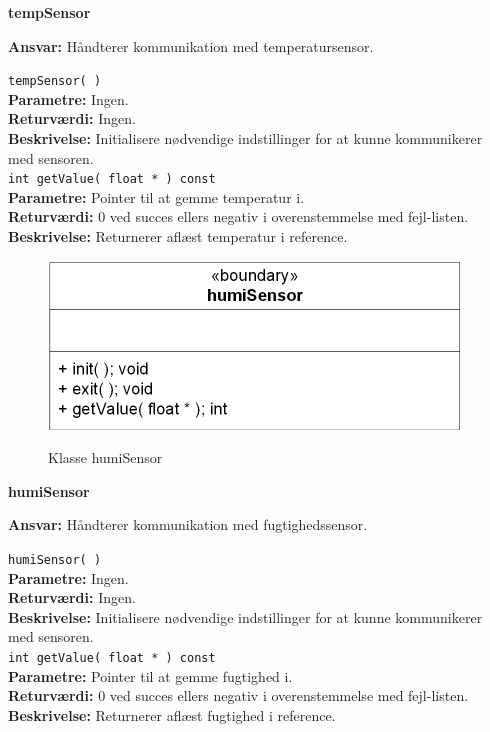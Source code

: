 {\centering
\textbf{tempSensor}\par
}
\textbf{Ansvar:} Håndterer kommunikation med temperatursensor. \

\verb+tempSensor( )+ \\
\textbf{Parametre:} Ingen. \\
\textbf{Returværdi:} Ingen. \\
\textbf{Beskrivelse:} Initialisere nødvendige indstillinger for at kunne kommunikerer med sensoren. \\

\verb+int getValue( float * ) const+ \\
\textbf{Parametre:} Pointer til at gemme temperatur i. \\
\textbf{Returværdi:} 0 ved succes ellers negativ i overenstemmelse med fejl-listen. \\
\textbf{Beskrivelse:} Returnerer aflæst temperatur i reference. \\


\begin{figure}[htbp] \centering
{\includegraphics[scale=1.3]{filer/design/Klassediagrammer/sw_psoc_humiSensor}}
\caption{Klasse humiSensor}
\label{fig:sw_psoc_class_humiSensor}
\end{figure} 

{\centering
\textbf{humiSensor}\par
}
\textbf{Ansvar:} Håndterer kommunikation med fugtighedssensor. \

\verb+humiSensor( )+ \\
\textbf{Parametre:} Ingen. \\
\textbf{Returværdi:} Ingen. \\
\textbf{Beskrivelse:} Initialisere nødvendige indstillinger for at kunne kommunikerer med sensoren. \\

\verb+int getValue( float * ) const+ \\
\textbf{Parametre:} Pointer til at gemme fugtighed i. \\
\textbf{Returværdi:} 0 ved succes ellers negativ i overenstemmelse med fejl-listen. \\
\textbf{Beskrivelse:} Returnerer aflæst fugtighed i reference. \\

